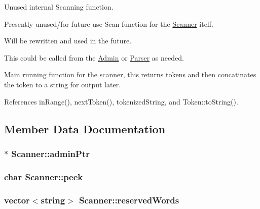 Unused internal Scanning function. 

Presently unused/for future use Scan function for the \hyperlink{classScanner}{Scanner} itelf.

Will be rewritten and used in the future.

This could be called from the \hyperlink{classAdmin}{Admin} or \hyperlink{classParser}{Parser} as needed.

Main running function for the scanner, this returns tokens and then concatinates the token to a string for output later. 

References inRange(), nextToken(), tokenizedString, and Token::toString().



\subsection{Member Data Documentation}
\hypertarget{classScanner_a05dbf851548561062953e9b1f235a349}{
\subsubsection[{adminPtr}]{$\ast$ {\bf Scanner::adminPtr}}}
\label{classScanner_a05dbf851548561062953e9b1f235a349}
\hypertarget{classScanner_a43b06598feabe08732abf86997cafa68}{
\subsubsection[{peek}]{\setlength{\rightskip}{0pt plus 5cm}char {\bf Scanner::peek}}}
\label{classScanner_a43b06598feabe08732abf86997cafa68}
\hypertarget{classScanner_afebea0f2ae1f1d0df1036a3a9c1a42df}{
\subsubsection[{reservedWords}]{\setlength{\rightskip}{0pt plus 5cm}vector$<$string$>$ {\bf Scanner::reservedWords}}}
\label{classScanner_afebea0f2ae1f1d0df1036a3a9c1a42df}


